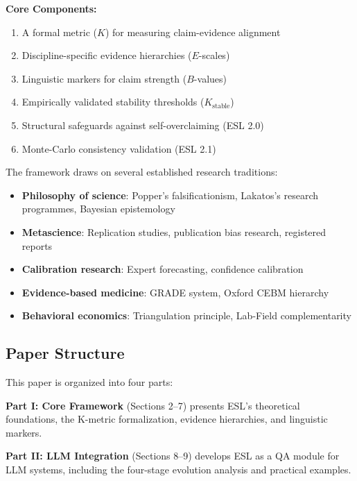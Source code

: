 \documentclass[11pt,a4paper]{article}
\begin{document}
\textbf{Core Components:}
\begin{enumerate}
    \item A formal metric ($K$) for measuring claim-evidence alignment
    \item Discipline-specific evidence hierarchies ($E$-scales)
    \item Linguistic markers for claim strength ($B$-values)
    \item Empirically validated stability thresholds ($K_{\text{stable}}$)
    \item Structural safeguards against self-overclaiming (ESL 2.0)
    \item Monte-Carlo consistency validation (ESL 2.1)
\end{enumerate}

The framework draws on several established research traditions:

\begin{itemize}
    \item \textbf{Philosophy of science}: Popper's falsificationism, Lakatos's research programmes, Bayesian epistemology \citep{Popper1959, Lakatos1978}
    \item \textbf{Metascience}: Replication studies, publication bias research, registered reports \citep{Ioannidis2005, Chambers2013}
    \item \textbf{Calibration research}: Expert forecasting, confidence calibration \citep{Tetlock2015}
    \item \textbf{Evidence-based medicine}: GRADE system, Oxford CEBM hierarchy \citep{GRADE2004, OxfordCEBM2011}
    \item \textbf{Behavioral economics}: Triangulation principle, Lab-Field complementarity \citep{FalkHeckman2009}
\end{itemize}

\subsection{Paper Structure}

This paper is organized into four parts:

\textbf{Part I: Core Framework} (Sections 2--7) presents ESL's theoretical foundations, the K-metric formalization, evidence hierarchies, and linguistic markers.

\textbf{Part II: LLM Integration} (Sections 8--9) develops ESL as a QA module for LLM systems, including the four-stage evolution analysis and practical examples.
\end{document}
